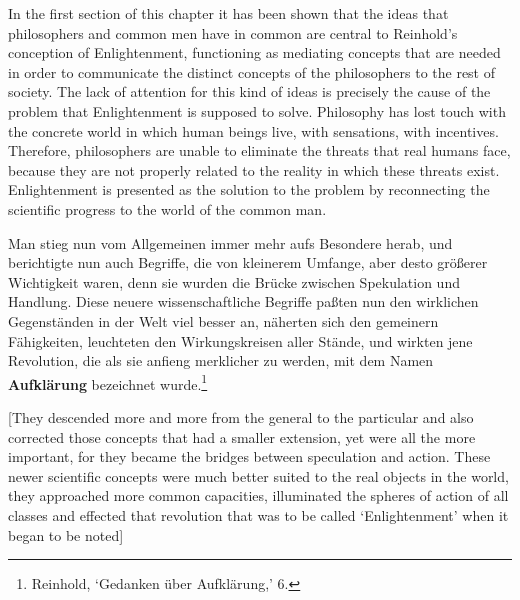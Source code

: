 In the first section of this chapter it has been shown that the ideas that philosophers and common men have in common are central to Reinhold's conception of Enlightenment, functioning as mediating concepts that are needed in order to communicate the distinct concepts of the philosophers to the rest of society. The lack of attention for this kind of ideas is precisely the cause of the problem that Enlightenment is supposed to solve. Philosophy has lost touch with the concrete world in which human beings live, with sensations, with incentives. Therefore, philosophers are unable to eliminate the threats that real humans face, because they are not properly related to the reality in which these threats exist. Enlightenment is presented as the solution to the problem by reconnecting the scientific progress to the world of the common man. 

Man stieg nun vom Allgemeinen immer mehr aufs Besondere herab, und berichtigte nun auch Begriffe, die von kleinerem Umfange, aber desto gr\"{o}\ss{}erer Wichtigkeit waren, denn sie wurden die Br\"{u}cke zwischen Spekulation und Handlung. Diese neuere wissenschaftliche Begriffe pa\ss{}ten nun den wirklichen Gegenst\"{a}nden in der Welt viel besser an, n\"{a}herten sich den gemeinern F\"{a}higkeiten, leuchteten den Wirkungskreisen aller St\"{a}nde, und wirkten jene Revolution, die als sie anfieng merklicher zu werden, mit dem Namen \textbf{Aufkl\"{a}rung} bezeichnet wurde.\footnote{ Reinhold, `Gedanken \"{u}ber Aufkl\"{a}rung,' 6.} 

[They descended more and more from the general to the particular and also corrected those concepts that had a smaller extension, yet were all the more important, for they became the bridges between speculation and action. These newer scientific concepts were much better suited to the real objects in the world, they approached more common capacities, illuminated the spheres of action of all classes and effected that revolution that was to be called `Enlightenment' when it began to be noted] 

